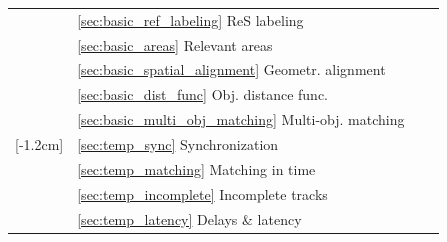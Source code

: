 \documentclass[conference]{IEEEtran}
\begin{document}
\begin{table}[htbp]
\begin{threeparttable}
\begin{tabularx}{\linewidth}{
			>{\hsize=0.02\hsize}X
			>{\hsize=0.38\hsize}X 
			>{\hsize=0.8\hsize}X 
			>{\hsize=0.8\hsize}X 
		}
		                                                                                        & \ref{sec:basic_ref_labeling} ReS labeling               & \basicChallengeReSLabling            & \basicDroneReSLabling                                                           \\ \cline{2-4}
		                                                                                        & \ref{sec:basic_areas} Relevant areas             & \basicChallengeAreas                 & \basicDroneAreas                                                                \\ \cline{2-4}
		                                                                                        & \ref{sec:basic_spatial_alignment} Geometr. alignment  & \basicChallengeGeometrAlign          & \basicDroneGeometrAlign                                                         \\ \cline{2-4}
		                                                                                        & \ref{sec:basic_dist_func} Obj. distance func.     & \basicChallengeObjDistance           & \basicDroneObjDistance                                                          \\ \cline{2-4}
		                                                                                        & \ref{sec:basic_multi_obj_matching} Multi-obj. matching & \basicChallengeMultiObjMatching      & \basicDroneMultiObjMatching                                                     \\ \midrule
		\parbox[t]{2mm}{[-1.2cm]{}}            & \ref{sec:temp_sync} Synchronization                 & \tempChallengeSync                   & \tempDroneSync                                                                  \\ 
		                                                                                        & \ref{sec:temp_matching} Matching in time                    & \tempChallengeMatching               & \tempDroneMatching                                                              \\ 
		                                                                                        & \ref{sec:temp_incomplete} Incomplete tracks         & \tempChallengeIncomplete             & \tempDroneIncomplete                                                            \\ 
		                                                                                        & \ref{sec:temp_latency} Delays \& latency            & \tempChallengeDelays                 & \tempDroneDelays                                                                \\ \midrule

\end{tabularx}
\end{threeparttable}
\end{table}
\end{document}

